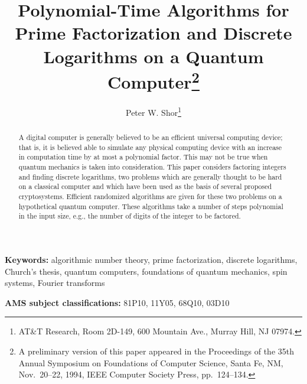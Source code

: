 \title{ 
Polynomial-Time Algorithms for Prime Factorization 
and Discrete Logarithms on a Quantum Computer\thanks{A preliminary version 
of this paper appeared
in the Proceedings of the 35th Annual Symposium on Foundations of Computer 
Science, Santa Fe, NM, Nov.\ 20--22, 1994, IEEE Computer Society Press, 
pp.\ 124--134.}
}
\author{Peter W. Shor\thanks{AT\&T Research,
Room 2D-149, 600 Mountain Ave., Murray Hill, NJ 07974.}
}
\date{}
\maketitle

\begin{abstract}
{
A digital computer is generally believed to be an efficient universal 
computing device; that is, it is believed able to simulate any 
physical computing device with an increase in computation time by
at most a polynomial factor.
This may not be true when quantum mechanics is taken into consideration.  
This paper considers
factoring integers and finding discrete logarithms, two problems 
which are generally thought to be hard on a classical computer and 
which have been used as the basis of several proposed cryptosystems.  
Efficient randomized algorithms are given for these two problems 
on a hypothetical quantum computer.  These algorithms take a number of 
steps polynomial in the input size, e.g., the number of digits of the 
integer to be factored.  
}
\end{abstract}

\vspace{\baselineskip}

{\bf Keywords:}
algorithmic number theory, prime factorization, discrete logarithms, 
Church's thesis, quantum computers, foundations of quantum mechanics, 
spin systems, Fourier transforms


\vspace{\baselineskip}
{\bf AMS subject classifications:}
81P10, 11Y05, 68Q10, 03D10
\pagestyle{myheadings}
\thispagestyle{plain}

\sloppy
\raggedbottom

\vfill
\newpage

